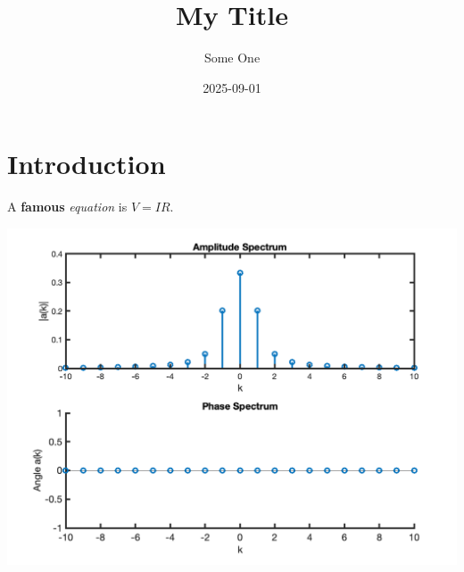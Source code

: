 \documentclass{article}
\title{My Title}
\author{Some One}
\date{2025-09-01}
\begin{document}
\maketitle

\section{Introduction}

A \textbf{famous} \textit{equation} is $V = IR$.

\includegraphics[alt={As long a description as you like}]{myfig.png}
\end{document}
